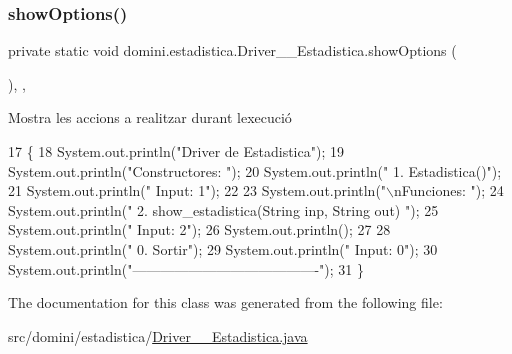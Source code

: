 \mbox{\label{classdomini_1_1estadistica_1_1Driver____Estadistica_ab42f06b8996094e10bd087ccf2f749e7}} 
\subsubsection{\texorpdfstring{show\+Options()}{showOptions()}}
{\footnotesize\ttfamily private static void domini.\+estadistica.\+Driver\+\_\+\+\_\+\+Estadistica.\+show\+Options (\begin{DoxyParamCaption}{ }\end{DoxyParamCaption})\hspace{0.3cm}{\ttfamily [inline]}, {\ttfamily [static]}, {\ttfamily [private]}}



Mostra les accions a realitzar durant l\textquotesingle{}execució 


\begin{DoxyCode}
17                                      \{
18         System.out.println(\textcolor{stringliteral}{"Driver de Estadistica"});
19         System.out.println(\textcolor{stringliteral}{"Constructores: "});
20         System.out.println(\textcolor{stringliteral}{"     1. Estadistica()"});
21         System.out.println(\textcolor{stringliteral}{"     Input: 1"});
22 
23         System.out.println(\textcolor{stringliteral}{"\(\backslash\)nFunciones: "});
24         System.out.println(\textcolor{stringliteral}{"     2. show\_estadistica(String inp, String out) "});
25         System.out.println(\textcolor{stringliteral}{"     Input: 2"});
26         System.out.println();
27 
28         System.out.println(\textcolor{stringliteral}{"     0. Sortir"});
29         System.out.println(\textcolor{stringliteral}{"     Input: 0"});
30         System.out.println(\textcolor{stringliteral}{"----------------------------------------"});
31     \}
\end{DoxyCode}


The documentation for this class was generated from the following file\+:\begin{DoxyCompactItemize}
\item 
src/domini/estadistica/\hyperlink{Driver____Estadistica_8java}{Driver\+\_\+\+\_\+\+Estadistica.\+java}\end{DoxyCompactItemize}
